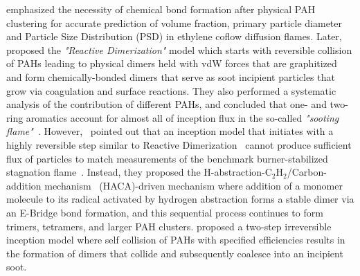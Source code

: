 





\citet{kholghy2019role} emphasized the necessity of chemical bond formation after physical PAH clustering for accurate prediction of volume fraction, primary particle diameter and Particle Size Distribution (PSD) in ethylene coflow diffusion flames. Later,~\citet{kholghy2018reactive} proposed the \textit{"Reactive Dimerization"} model which starts with reversible collision of PAHs leading to physical dimers held with vdW forces that are graphitized and form chemically-bonded dimers that serve as soot incipient particles that grow via  coagulation and surface reactions. They also performed a systematic analysis of the contribution of different PAHs, and concluded that one- and two-ring aromatics account for almost all of inception flux in the so-called \textit{"sooting flame"}~\citep{desgroux2017comparative}. However,~\citet{frenklach2020mechanism} pointed out that an inception model that initiates with a highly reversible step similar to Reactive Dimerization~\citep{kholghy2018reactive} cannot produce sufficient flux of particles to match measurements of the benchmark burner-stabilized stagnation flame~\citep{abid2009quantitative}. Instead, they proposed the H-abstraction-$\mathrm{C_2H_2}$/Carbon-addition  mechanism~\citep{frenklach1991detailed, appel2000kinetic} (HACA)-driven mechanism where addition of a monomer molecule to its radical activated by hydrogen abstraction forms a stable dimer via an E-Bridge bond formation, and this sequential process continues to form trimers, tetramers, and larger PAH clusters. \citet{blanquart2009joint} proposed a two-step irreversible inception model where self collision of PAHs with specified efficiencies results in the formation of dimers that collide and subsequently coalesce into an incipient soot.

